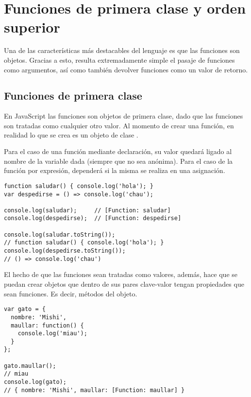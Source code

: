 \section{Funciones de primera clase y orden superior}

Una de las características más destacables del lenguaje es que las funciones son objetos. Gracias a esto, resulta extremadamente simple el pasaje de funciones como argumentos, así como también devolver funciones como un valor de retorno.

\subsection{Funciones de primera clase}

En JavaScript las funciones son objetos de primera clase, dado que las funciones son tratadas como cualquier otro valor. Al momento de crear una función, en realidad lo que se crea es un objeto de clase .

Para el caso de una función mediante declaración, su valor quedará ligado al nombre de la variable dada (siempre que no sea anónima). Para el caso de la función por expresión, dependerá si la misma se realiza en una asignación.

\begin{lstlisting}[title={Analizando el valor de una función}]
function saludar() { console.log('hola'); }
var despedirse = () => console.log('chau');

console.log(saludar);     // [Function: saludar]
console.log(despedirse);  // [Function: despedirse]

console.log(saludar.toString());  
// function saludar() { console.log('hola'); }
console.log(despedirse.toString()); 
// () => console.log('chau')
\end{lstlisting}

El hecho de que las funciones sean tratadas como valores, además, hace que se puedan crear objetos que dentro de sus pares clave-valor tengan propiedades que sean funciones. Es decir, métodos del objeto.

\begin{lstlisting}[title={Asignando una función como valor de una propiedad a un objeto}]
var gato = {
  nombre: 'Mishi',
  maullar: function() {
    console.log('miau');
  }
};

gato.maullar();   
// miau
console.log(gato);  
// { nombre: 'Mishi', maullar: [Function: maullar] }
\end{lstlisting}

